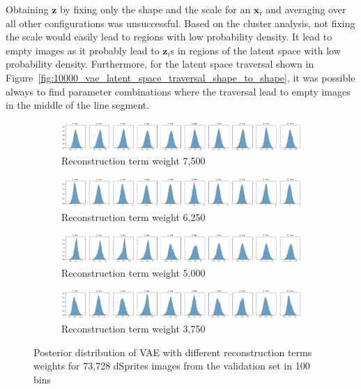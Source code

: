 Obtaining $\bm{z}$ by fixing only the shape and the scale for an $\bm{x}_i$ and averaging over all other configurations was unsuccessful.
Based on the cluster analysis, not fixing the scale would easily lead to regions with low probability density.
It lead to empty images as it probably lead to $\bm{z}_i$s in regions of the latent space with low probability density.
Furthermore, for the latent space traversal shown in Figure~\ref{fig:10000_vae_latent_space_traversal_shape_to_shape}, it was possible always to find parameter combinations where the traversal lead to empty images in the middle of the line segment.

\begin{figure}
    \centering
    \begin{subfigure}{\textwidth}
        \centering
        \includegraphics[width=\textwidth]{images/latent_space_entanglement/vae_dsprites_lf_7500_dist.png}
        \caption{Reconstruction term weight 7,500}
    \end{subfigure}
    \begin{subfigure}{\textwidth}
        \centering
        \includegraphics[width=\textwidth]{images/latent_space_entanglement/vae_dsprites_lf_6250_dist.png}
        \caption{Reconstruction term weight 6,250}
    \end{subfigure}
    \begin{subfigure}{\textwidth}
        \centering
        \includegraphics[width=\textwidth]{images/latent_space_entanglement/vae_dsprites_lf_5000_dist.png}
        \caption{Reconstruction term weight 5,000}
    \end{subfigure}
    \begin{subfigure}{\textwidth}
        \centering
        \includegraphics[width=\textwidth]{images/latent_space_entanglement/vae_dsprites_lf_3750_dist.png}
        \caption{Reconstruction term weight 3,750}
    \end{subfigure}
    \caption[VAE Latent Space Distribution - Different Reconstruction Term Weights]{Posterior distribution of VAE with different reconstruction terms weights for 73,728 dSprites images from the validation set in 100 bins}
    \label{fig:7500_5000_vae_latent_space_distribution_scales_and_shapes}
\end{figure}

